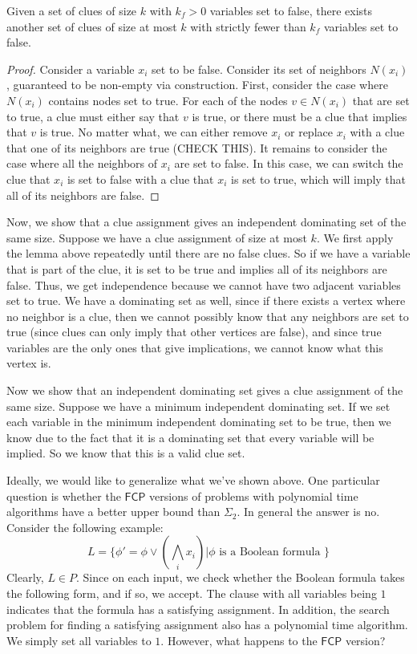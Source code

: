 \documentclass[runningheads,a4paper]{llncs}
\begin{document}
\begin{lemma} Given a set of clues of size $k$ with $k_f > 0$ variables set to false, there exists another set of clues of size at most $k$ with strictly fewer than $k_f$ variables set to false.
\end{lemma}

\begin{proof} 
Consider a variable $x_i$ set to be false. Consider its set of neighbors $N(x_i)$, guaranteed to be non-empty via construction. First, consider the case where $N(x_i)$ contains nodes set to true. For each of the nodes $v \in N(x_i)$ that are set to true, a clue must either say that $v$ is true, or there must be a clue that implies that $v$ is true. No matter what, we can either remove $x_i$ or replace $x_i$ with a clue that one of its neighbors are true (CHECK THIS). It remains to consider the case where all the neighbors of $x_i$ are set to false. In this case, we can switch the clue that $x_i$ is set to false with a clue that $x_i$ is set to true, which will imply that all of its neighbors are false.
\end{proof}

Now, we show that a clue assignment gives an independent dominating set of the same size. Suppose we have a clue assignment of size at most $k$. We first apply the lemma above repeatedly until there are no false clues. So if we have a variable that is part of the clue, it is set to be true and implies all of its neighbors are false. Thus, we get independence because we cannot have two adjacent variables set to true. We have a dominating set as well, since if there exists a vertex where no neighbor is a clue, then we cannot possibly know that any neighbors are set to true (since clues can only imply that other vertices are false), and since true variables are the only ones that give implications, we cannot know what this vertex is. 

Now we show that an independent dominating set gives a clue assignment of the same size. Suppose we have a minimum independent dominating set. If we set each variable in the minimum independent dominating set to be true, then we know due to the fact that it is a dominating set that every variable will be implied. So we know that this is a valid clue set.

Ideally, we would like to generalize what we've shown above. One particular question is whether the $\mathsf{FCP}$ versions of problems with polynomial time algorithms have a better upper bound than $\Sigma_2$. In general the answer is no. Consider the following example:
\[ L = \{ \phi' = \phi \vee \left( \bigwedge_i x_i \right) | \phi \text{ is a Boolean formula }\} \]
Clearly, $L \in P$. Since on each input, we check whether the Boolean formula takes the following form, and if so, we accept. The clause with all variables being $1$ indicates that the formula has a satisfying assignment. In addition, the search problem for finding a satisfying assignment also has a polynomial time algorithm. We simply set all variables to $1$. However, what happens to the $\mathsf{FCP}$ version?
\end{document}
